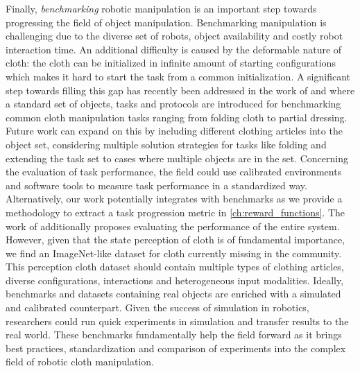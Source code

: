 \documentclass[\home/main.tex]{subfiles}
\begin{document}
Finally, \emph{benchmarking} robotic manipulation is an important step towards progressing the field of object manipulation. Benchmarking manipulation is challenging due to the diverse set of robots, object availability and costly robot interaction time. An additional difficulty is caused by the deformable nature of cloth: the cloth can be initialized in infinite amount of starting configurations which makes it hard to start the task from a common initialization. A significant step towards filling this gap has recently been addressed in the work of \autocite{Camacho2020} and \textcite{garciacamacho2021household} where a standard set of objects, tasks and protocols are introduced for benchmarking common cloth manipulation tasks ranging from folding cloth to partial dressing. Future work can expand on this by including different clothing articles into the object set, considering multiple solution strategies for tasks like folding and extending the task set to cases where multiple objects are in the set. Concerning the evaluation of task performance, the field could use calibrated environments and software tools to measure task performance in a standardized way. Alternatively, our work potentially integrates with benchmarks as we provide a methodology to extract a task progression metric in \cref{ch:reward_functions}. The work of \textcite{Camacho2020} additionally proposes evaluating the performance of the entire system. However, given that the state perception of cloth is of fundamental importance, we find an ImageNet-like dataset for cloth currently missing in the community. This perception cloth dataset should contain multiple types of clothing articles, diverse configurations, interactions and heterogeneous input modalities. 
Ideally, benchmarks and datasets containing real objects are enriched with a simulated and calibrated counterpart. Given the success of simulation in robotics, researchers could run quick experiments in simulation and transfer results to the real world. 
These benchmarks fundamentally help the field forward as it brings best practices, standardization and comparison of experiments into the complex field of robotic cloth manipulation. 

\end{document}
